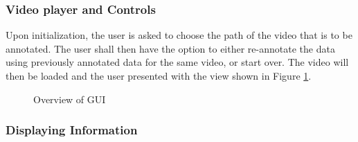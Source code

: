 \subsubsection{Video player and Controls}

Upon initialization, the user is asked to choose the path of the video that is to be annotated. The user shall then have the option to either re-annotate the data using previously annotated data for the same video, or start over. The video will then be loaded and the user presented with the view shown in  Figure \ref{fig:GUI_overview}.

\begin{figure}[H]
\caption{Overview of GUI}
\label{fig:GUI_overview}
\end{figure}

\subsubsection{Displaying Information}

